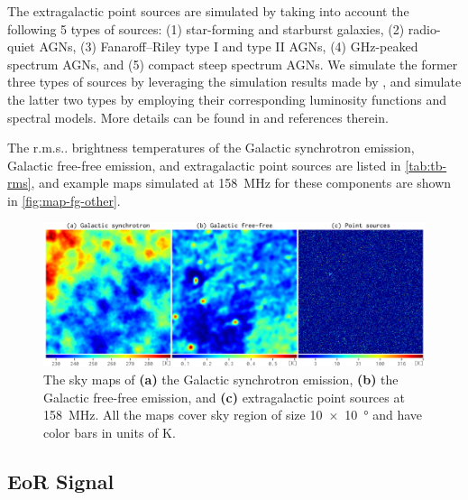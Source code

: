 \documentclass[twocolumn]{aastex62}
\makeatletter
\newcommand{\rms}{r.m.s\@ifnextchar.{}{.\@}}
\makeatother
\begin{document}
The extragalactic point sources are simulated by taking into account the
following 5 types of sources: (1) star-forming and starburst galaxies,
(2) radio-quiet AGNs, (3) Fanaroff--Riley type I and type II AGNs,
(4) GHz-peaked spectrum AGNs, and (5) compact steep spectrum AGNs.
We simulate the former three types of sources by leveraging the simulation
results made by \citet{wilman2008}, and simulate the latter two types
by employing their corresponding luminosity functions and spectral models.
More details can be found in \citet{wang2010} and references therein.

The \rms{} brightness temperatures of the Galactic synchrotron emission,
Galactic free-free emission, and extragalactic point sources are listed
in \autoref{tab:tb-rms}, and example maps simulated at \SI{158}{\MHz}
for these components are shown in \autoref{fig:map-fg-other}.

\begin{figure}
  \centering
  \includegraphics[width=\textwidth]{foregrounds-f158}
  \caption{\label{fig:map-fg-other}%
    The sky maps of
    \textbf{(a)} the Galactic synchrotron emission,
    \textbf{(b)} the Galactic free-free emission, and
    \textbf{(c)} extragalactic point sources
    at \SI{158}{\MHz}.
    All the maps cover sky region of size
    \SI[product-units=repeat]{10 x 10}{\degree}
    and have color bars in units of \si{\kelvin}.
  }
\end{figure}


\subsection{EoR Signal}
\label{sec:eor-signal}
\end{document}
